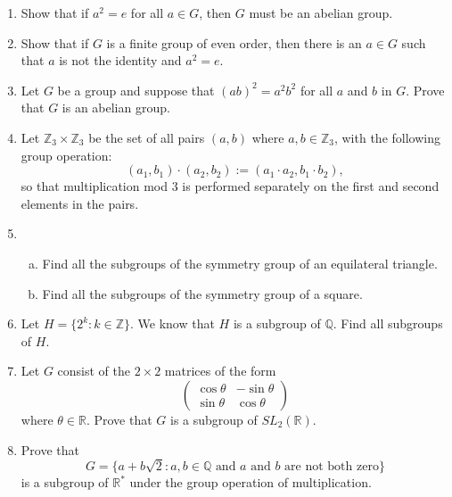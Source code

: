 {\begin{enumerate}
 
 
\item \label{abelian2}
Show that if $a^2 = e$ for all $a \in G$, then $G$ must be an abelian
group. 
 
 
\item
Show that if $G$ is a finite group of even order, then there is an $a
\in G$ such that $a$ is not the identity and $a^2 = e$.
 
 
\item
Let $G$ be a group and suppose that $(ab)^2 = a^2b^2$ for all $a$ and
$b$ in $G$.  Prove that $G$ is an abelian group. 
 
 
\item
Let ${\mathbb Z}_3 \times {\mathbb Z}_3$ be the set of all pairs $(a,b)$ where $a,b \in {\mathbb Z}_3$, with the following group operation: 
\[ (a_1,b_1) \cdot (a_2,b_2) := (a_1\cdot a_2,b_1 \cdot b_2),\]
so that multiplication mod 3 is performed separately on the first and second elements in the pairs.

 
\item
\begin{enumerate}[(a)]
\item
Find all the subgroups of the symmetry group of an equilateral
triangle. 
\item
Find all the subgroups of the symmetry group of a square.
\end{enumerate} 
 

 
 
\item
Let $H = \{2^k : k \in {\mathbb Z} \}$. We know that $H$ is a subgroup of $\mathbb{Q}$.  Find all subgroups of $H$. 

 
\item
Let $G$ consist of the $2 \times 2$ matrices of the form
\[
\begin{pmatrix}
\cos \theta & -\sin \theta \\
\sin \theta & \cos \theta
\end{pmatrix}
\]
where $\theta \in {\mathbb R}$. Prove that $G$ is a subgroup of $SL_2(
{\mathbb R})$. 
 
 
\item
Prove that
\[
G =
\{ a + b \sqrt{2} : \mbox{$a, b \in {\mathbb
Q}$ and $a$ and $b$ are not both zero}  \}
\]
is a subgroup of ${\mathbb R}^{\ast}$ under the group operation of
multiplication. 
 

\end{enumerate}}
